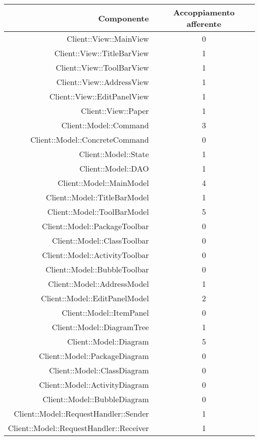 \documentclass[../PianoDiQualifica.tex]{subfiles}
\begin{document}
					\begin{longtable}{|r|c|}
						\hline
						\rowcolor{blue!30}\textbf{Componente} & \textbf{Accoppiamento afferente} \\
						\hline
						\endhead
						Client::View::MainView & 0 \\ \hline
						Client::View::TitleBarView & 1 \\ \hline
						Client::View::ToolBarView & 1 \\ \hline
						Client::View::AddressView & 1 \\ \hline
						Client::View::EditPanelView & 1 \\ \hline
						Client::View::Paper & 1 \\ \hline
						Client::Model::Command & 3\\ \hline
						Client::Model::ConcreteCommand & 0 \\ \hline
						Client::Model::State & 1 \\ \hline
						Client::Model::DAO & 1 \\ \hline
						Client::Model::MainModel &4 \\ \hline
						Client::Model::TitleBarModel & 1 \\ \hline
						Client::Model::ToolBarModel & 5 \\ \hline
						Client::Model::PackageToolbar & 0 \\ \hline
						Client::Model::ClassToolbar & 0 \\ \hline
						Client::Model::ActivityToolbar & 0 \\ \hline
						Client::Model::BubbleToolbar & 0 \\ \hline
						Client::Model::AddressModel & 1 \\ \hline
						Client::Model::EditPanelModel & 2 \\ \hline
						Client::Model::ItemPanel & 0 \\ \hline
						Client::Model::DiagramTree & 1 \\ \hline
						Client::Model::Diagram & 5 \\ \hline
						Client::Model::PackageDiagram & 0 \\ \hline
						Client::Model::ClassDiagram & 0 \\ \hline
						Client::Model::ActivityDiagram & 0 \\ \hline
						Client::Model::BubbleDiagram & 0 \\ \hline
						Client::Model::RequestHandler::Sender & 1 \\ \hline
						Client::Model::RequestHandler::Receiver & 1 \\ \hline

\end{longtable}
\end{document}
